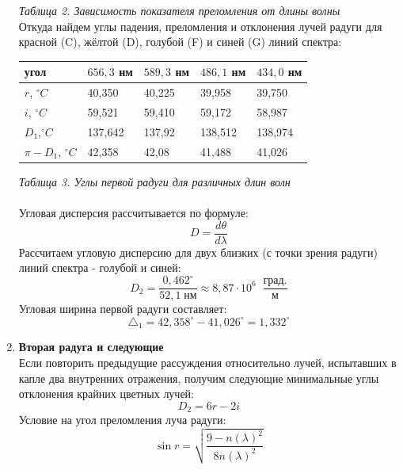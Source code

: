 \documentclass[a4paper]{article}
\begin{document}
\begin{multicols}{2}
\begin{enumerate}
\begin{center}
\begin{tabular}{|l|l|l|l|}
\hline
\end{tabular}
\end{center}
\textit{Таблица 2. Зависимость показателя преломления от длины волны}\\
Откуда найдем углы падения, преломления и отклонения лучей радуги для красной (C), жёлтой (D), голубой (F) и синей (G) линий спектра:
\begin{center}
\footnotesize
\begin{tabular}{|l|l|l|l|l|}
\hline
угол & $656,3$ нм & $589,3$ нм & $486,1$ нм & $434,0$ нм\\
\hline
$r$, $^{\circ}C$  & 40,350 & 40,225 & 39,958 & 39,750\\
\hline 
$i$, $^{\circ}C$ & 59,521 & 59,410 & 59,172 & 58,987\\
\hline
$D_1$,$^{\circ}C$ & 137,642 & 137,92 & 138,512 & 138,974\\
\hline
$\pi - D_1$, $^{\circ}C$ & 42,358 & 42,08 & 41,488 & 41,026\\
\hline  
\end{tabular}
\end{center}
\textit{ Таблица 3. Углы первой радуги для различных длин волн}\\
\\
Угловая дисперсия рассчитывается по формуле:
\begin{equation}
D = \frac{d\theta}{d\lambda}
\label{short}
\end{equation}
Рассчитаем угловую дисперсию для двух близких (с точки зрения радуги) линий спектра - голубой и синей:
\begin{equation}
D_2 = \frac{0,462^{\circ}}{52,1 \; \textit{нм}} \approx 8,87 \cdot 10^6 \; \; \frac{\textit{град.}}{\textit{м}}
\label{short}
\end{equation}
Угловая ширина первой радуги составляет:
\begin{equation}
\triangle_1 = 42,358^{\circ} - 41,026^{\circ} = 1,332^{\circ} 
\label{short}
\end{equation}
\item \textbf{Вторая радуга и следующие}\\
Если повторить предыдущие рассуждения относительно лучей, испытавших в капле два внутренних отражения, получим следующие минимальные углы отклонения крайних цветных лучей:
\begin{equation}
D_2 = 6r - 2i
\label{short}
\end{equation}
Условие на угол преломления луча радуги:
\begin{equation}
\sin r = \sqrt{\frac{9 - n(\lambda)^2}{8n(\lambda)^2}}

\end{equation}
\end{enumerate}
\end{multicols}
\end{document}
